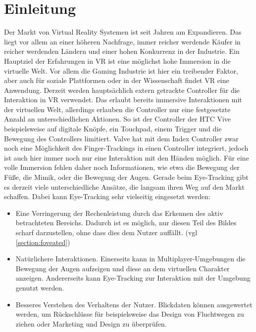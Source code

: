 \chapter{Einleitung}
Der Markt von Virtual Reality Systemen ist seit Jahren am Expandieren. Das liegt vor allem an einer höheren Nachfrage, immer reicher werdende Käufer in reicher werdenden Ländern und einer hohen Konkurrenz in der Industrie. \cite{grandview.2020} Ein Hauptziel der Erfahrungen in \ac{VR} ist eine möglichst hohe Immersion in die virtuelle Welt. Vor allem die Gaming Industrie ist hier ein treibender Faktor, aber auch für soziale Plattformen oder in der Wissenschaft findet \ac{VR} eine Anwendung. Derzeit werden hauptsächlich extern getrackte Controller für die Interaktion in \ac{VR} verwendet. Das erlaubt bereits immersive Interaktionen mit der virtuellen Welt, allerdings erlauben die Controller nur eine festgesetzte Anzahl an unterschiedlichen Aktionen. So ist der Controller der HTC Vive beispielsweise auf digitale Knöpfe, ein Touchpad, einem Trigger und die Bewegung des Controllers limitiert. Valve hat mit dem Index Controller zwar noch eine Möglichkeit des Finger-Trackings in einen Controller integriert, jedoch ist auch hier immer noch nur eine Interaktion mit den Händen möglich. Für eine volle Immersion fehlen daher noch Informationen, wie etwa die Bewegung der Füße, die Mimik, oder die Bewegung der Augen. Gerade beim Eye-Tracking gibt es derzeit viele unterschiedliche Ansätze, die langsam ihren Weg auf den Markt schaffen. Dabei kann Eye-Tracking sehr vielseitig eingesetzt werden:
\begin{itemize}
	\item Eine Verringerung der Rechenleistung durch das Erkennen des aktiv betrachteten Bereichs. Dadurch ist es möglich, nur diesen Teil des Bildes scharf darzustellen, ohne dass dies dem Nutzer auffällt.\cite{Rogers.2019} (vgl \autoref{section:foveated})
	\item Natürlichere Interaktionen. Einerseits kann in Multiplayer-Umgebungen die Bewegung der Augen aufzeigen und diese an dem virtuellen Charakter anzeigen. Andererseits kann Eye-Tracking zur Interaktion mit der Umgebung genutzt werden.\cite{Rogers.2019} 
	\item Besseres Verstehen des Verhaltens der Nutzer. Blickdaten können ausgewertet werden, um Rückschlüsse für beispielsweise das Design von Fluchtwegen zu ziehen oder Marketing und Design zu überprüfen.\cite{Rogers.2019}
\end{itemize}
